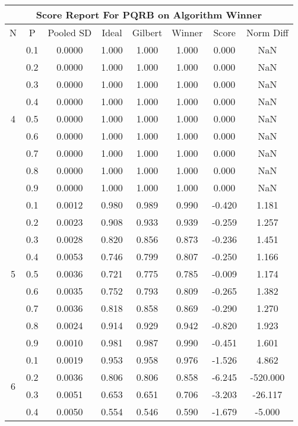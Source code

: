 \documentclass[11pt,a4paper]{report}
\begin{document}
\begin{longtable}{ | c | c || c | c | c | c | c | c | }
\hline
\multicolumn{8}{|c|}{ Score Report For PQRB on Algorithm Winner} \\
\hline
N & P & Pooled SD &  Ideal &  Gilbert & Winner  & Score & Norm Diff \\
 \hline
 \hline
 \endhead
\multirow{9}{*}{4} & 0.1 & 0.0000 & 1.000 & 1.000 & 1.000 & 0.000 & NaN \\
 & 0.2 & 0.0000 & 1.000 & 1.000 & 1.000 & 0.000 & NaN \\
 & 0.3 & 0.0000 & 1.000 & 1.000 & 1.000 & 0.000 & NaN \\
 & 0.4 & 0.0000 & 1.000 & 1.000 & 1.000 & 0.000 & NaN \\
 & 0.5 & 0.0000 & 1.000 & 1.000 & 1.000 & 0.000 & NaN \\
 & 0.6 & 0.0000 & 1.000 & 1.000 & 1.000 & 0.000 & NaN \\
 & 0.7 & 0.0000 & 1.000 & 1.000 & 1.000 & 0.000 & NaN \\
 & 0.8 & 0.0000 & 1.000 & 1.000 & 1.000 & 0.000 & NaN \\
 & 0.9 & 0.0000 & 1.000 & 1.000 & 1.000 & 0.000 & NaN \\
 \hline
\multirow{9}{*}{5} & 0.1 & 0.0012 & 0.980 & 0.989 & 0.990 & -0.420 & 1.181 \\
 & 0.2 & 0.0023 & 0.908 & 0.933 & 0.939 & -0.259 & 1.257 \\
 & 0.3 & 0.0028 & 0.820 & 0.856 & 0.873 & -0.236 & 1.451 \\
 & 0.4 & 0.0053 & 0.746 & 0.799 & 0.807 & -0.250 & 1.166 \\
 & 0.5 & 0.0036 & 0.721 & 0.775 & 0.785 & -0.009 & 1.174 \\
 & 0.6 & 0.0035 & 0.752 & 0.793 & 0.809 & -0.265 & 1.382 \\
 & 0.7 & 0.0036 & 0.818 & 0.858 & 0.869 & -0.290 & 1.270 \\
 & 0.8 & 0.0024 & 0.914 & 0.929 & 0.942 & -0.820 & 1.923 \\
 & 0.9 & 0.0010 & 0.981 & 0.987 & 0.990 & -0.451 & 1.601 \\
 \hline
\multirow{9}{*}{6} & 0.1 & 0.0019 & 0.953 & 0.958 & 0.976 & -1.526 & 4.862 \\
 & 0.2 & 0.0036 & 0.806 & 0.806 & 0.858 & -6.245 & -520.000 \\
 & 0.3 & 0.0051 & 0.653 & 0.651 & 0.706 & -3.203 & -26.117 \\
 & 0.4 & 0.0050 & 0.554 & 0.546 & 0.590 & -1.679 & -5.000 \\

\end{longtable}
\end{document}
